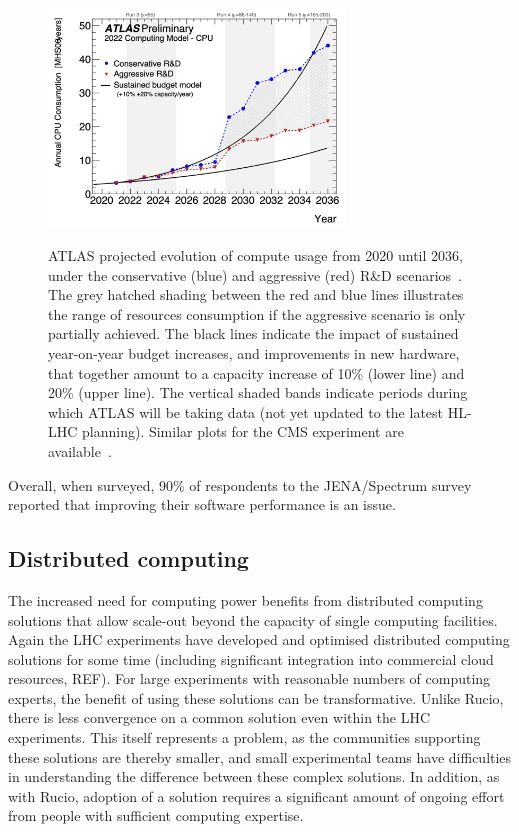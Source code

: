 \begin{figure}[htbp]
\begin{center}
\includegraphics[width=0.7\textwidth]{figures/Figure4} \\ 
\caption{ATLAS projected evolution of compute usage from 2020 until 2036, under the conservative (blue) and aggressive (red) R\&D scenarios~\cite{CERN-LHCC-2022-005}. The grey hatched shading between the red and blue lines illustrates the range of resources consumption if the aggressive scenario is only partially achieved. The black lines indicate the impact of sustained year-on-year budget increases, and improvements in new hardware, that together amount to a capacity increase of 10\% (lower line) and 20\% (upper line). The vertical shaded bands indicate periods during which ATLAS will be taking data  (not yet updated to the latest HL-LHC planning). Similar plots for the CMS experiment are available~\cite{Software:2815292}. }
\label{figures:Fig4}
\end{center}
\end{figure}


Overall, when surveyed, 90\% of respondents to the JENA/Spectrum survey reported that improving their software performance is an issue.



\subsection{Distributed computing}


The increased need for computing power benefits from distributed computing solutions that allow scale-out beyond the capacity of single computing facilities. Again the LHC experiments have developed and optimised distributed computing solutions for some time (including significant integration into commercial cloud resources, REF).
For large experiments with reasonable numbers of computing experts, the benefit of using these solutions can be transformative. Unlike Rucio, there is less convergence on a common solution even within the LHC experiments. This itself represents a problem, as the communities supporting these solutions are thereby smaller, and small experimental teams have difficulties in understanding the difference between these complex solutions. In addition, as with Rucio, adoption of a solution requires a significant amount of ongoing effort from people with sufficient computing expertise.



